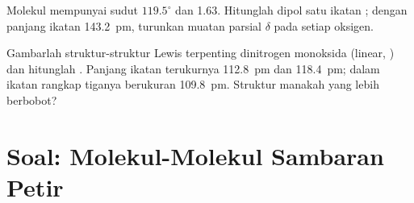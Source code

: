 \begin{exercise}[$\star\star\star$]\label{exo:b1:lewis-resonance-vsepr:11}
Molekul  mempunyai sudut $119.5^\circ$ dan 
\qty{1.63}{\debye}. Hitunglah dipol satu ikatan ; dengan panjang
ikatan \qty{143.2}{pm}, turunkan muatan parsial $\delta$ pada setiap
oksigen.
\end{exercise}

\begin{exercise}[$\star\star\star$]\label{exo:b1:lewis-resonance-vsepr:12}
Gambarlah struktur-struktur Lewis terpenting dinitrogen monoksida
 (linear, ) dan hitunglah . Panjang
ikatan terukurnya  \qty{112.8}{pm} dan 
\qty{118.4}{pm}; dalam  ikatan rangkap tiganya berukuran
\qty{109.8}{pm}. Struktur manakah yang lebih berbobot?
\end{exercise}

\section{Soal: Molekul-Molekul Sambaran Petir}

